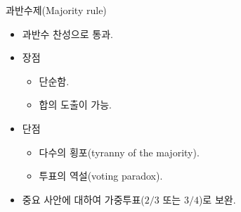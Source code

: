 \documentclass[aspectratio=169,xcolor=dvipsnames,handout]{beamer}
\begin{document}
\begin{frame}{과반수제(Majority rule)}
    \begin{itemize}[<+->]
        \item 과반수 찬성으로 통과.
        \item 장점
        \begin{itemize}
            \item 단순함.
            \item 합의 도출이 가능.
        \end{itemize}
        \item 단점
        \begin{itemize}
            \item 다수의 횡포(tyranny of the majority).
            \item 투표의 역설(voting paradox).
        \end{itemize}
    \item 중요 사안에 대하여 가중투표($2/3$ 또는 $3/4$)로 보완.
    \end{itemize}
\end{frame}
\end{document}
